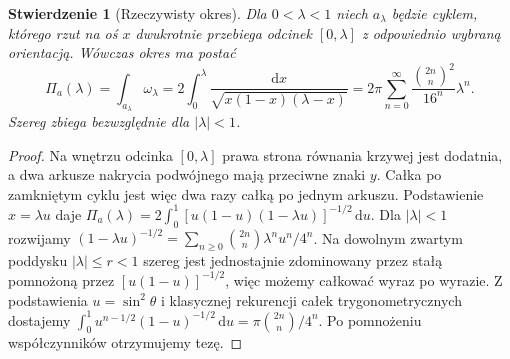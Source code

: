 \documentclass[11pt,a4paper,oneside]{report}
\newcommand{\dd}{\mathrm d}
\theoremstyle{plain}
\newtheorem{stwierdzenie}[twierdzenie]{Stwierdzenie}
\theoremstyle{definition}
\theoremstyle{remark}
\begin{document}
\begin{stwierdzenie}[Rzeczywisty okres]
\label{prop:xv-legendre-period}
Dla $0<\lambda<1$ niech $a_\lambda$ będzie cyklem,
którego rzut na oś $x$ dwukrotnie przebiega odcinek
$[0,\lambda]$ z odpowiednio wybraną orientacją.
Wówczas okres ma postać
\[
\Pi_a(\lambda)=\int_{a_\lambda}\omega_\lambda
=2\int_0^\lambda\frac{\dd x}
{\sqrt{x(1-x)(\lambda-x)}}
=2\pi\sum_{n=0}^\infty
\frac{\binom{2n}{n}^2}{16^n}\lambda^n.
\]
Szereg zbiega bezwzględnie dla $|\lambda|<1$.
\end{stwierdzenie}
\begin{proof}
Na wnętrzu odcinka $[0,\lambda]$ prawa strona równania
krzywej jest dodatnia, a dwa arkusze nakrycia podwójnego
mają przeciwne znaki $y$. Całka po zamkniętym cyklu
jest więc dwa razy całką po jednym arkuszu.
Podstawienie $x=\lambda u$ daje
$\Pi_a(\lambda)=2\int_0^1
[u(1-u)(1-\lambda u)]^{-1/2}\,\dd u$.
Dla $|\lambda|<1$ rozwijamy
$(1-\lambda u)^{-1/2}=
\sum_{n\ge0}\binom{2n}{n}\lambda^nu^n/4^n$.
Na dowolnym zwartym poddysku $|\lambda|\le r<1$
szereg jest jednostajnie zdominowany przez
stałą pomnożoną przez $[u(1-u)]^{-1/2}$,
więc możemy całkować wyraz po wyrazie.
Z podstawienia $u=\sin^2\theta$ i klasycznej
rekurencji całek trygonometrycznych dostajemy
$\int_0^1 u^{n-1/2}(1-u)^{-1/2}\,\dd u
=\pi\binom{2n}{n}/4^n$.
Po pomnożeniu współczynników otrzymujemy tezę.
\end{proof}
\end{document}
